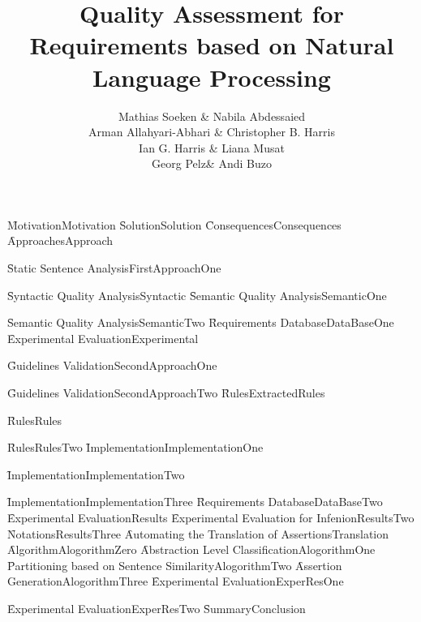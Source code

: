 \documentclass{agra_beamer}
\title{Quality Assessment for Requirements based on Natural Language Processing}
\author[Mathias and Arman]{
	 Mathias Soeken & Nabila Abdessaied\\   
	 Arman Allahyari-Abhari & Christopher B. Harris\\ 
	 Ian G. Harris & Liana Musat\\ 
	 Georg Pelz& Andi Buzo	\vspace*{-0.4cm}	
}
\institute{\hspace{1cm}\large{Rolf Drechsler}\vspace*{1cm}}
\date{}
\begin{document}
\maketitle


\f{Motivation}{Motivation}
\f{Solution}{Solution}
\f{Consequences}{Consequences}
\f{Approaches}{Approach}

\f{Static Sentence Analysis}{FirstApproachOne}

\f{Syntactic Quality Analysis}{Syntactic}
\f{Semantic Quality Analysis}{SemanticOne}
\addtocounter{framenumber}{-1}
\f{Semantic Quality Analysis}{SemanticTwo}
\f{Requirements Database}{DataBaseOne}
\f{Experimental Evaluation}{Experimental}

\f{Guidelines Validation}{SecondApproachOne}
\addtocounter{framenumber}{-1}
\f{Guidelines Validation}{SecondApproachTwo}
\f{Rules}{ExtractedRules}
\addtocounter{framenumber}{-1}
\f{Rules}{Rules}
\addtocounter{framenumber}{-1}
\f{Rules}{RulesTwo}
\f{Implementation}{ImplementationOne}
\addtocounter{framenumber}{-1}
\f{Implementation}{ImplementationTwo}
\addtocounter{framenumber}{-1}
\f{Implementation}{ImplementationThree}
\f{Requirements Database}{DataBaseTwo}
\f{Experimental Evaluation}{Results}
\f{Experimental Evaluation for Infenion}{ResultsTwo}
\f{Notations}{ResultsThree}
\f{Automating the Translation of Assertions}{Translation}
\f{Algorithm}{AlogorithmZero}
\f{Abstraction Level Classification}{AlogorithmOne}
\f{Partitioning based on Sentence Similarity}{AlogorithmTwo}
\f{Assertion Generation}{AlogorithmThree}
\f{Experimental Evaluation}{ExperResOne}
\addtocounter{framenumber}{-1}
\f{Experimental Evaluation}{ExperResTwo}
\f{Summary}{Conclusion}

\end{document}
